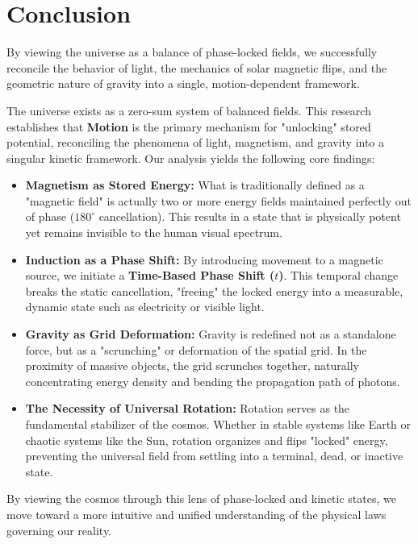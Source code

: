 \documentclass[11pt]{article}
\begin{document}
\section{Conclusion}

By viewing the universe as a balance of phase-locked fields, we successfully reconcile the behavior of light, the mechanics of solar magnetic flips, and the geometric nature of gravity into a single, motion-dependent framework.

The universe exists as a zero-sum system of balanced fields. This research establishes that \textbf{Motion} is the primary mechanism for "unlocking" stored potential, reconciling the phenomena of light, magnetism, and gravity into a singular kinetic framework. Our analysis yields the following core findings:

\begin{itemize}
    \item \textbf{Magnetism as Stored Energy:} What is traditionally defined as a "magnetic field" is actually two or more energy fields maintained perfectly out of phase ($180^\circ$ cancellation). This results in a state that is physically potent yet remains invisible to the human visual spectrum.
    
    \item \textbf{Induction as a Phase Shift:} By introducing movement to a magnetic source, we initiate a \textbf{Time-Based Phase Shift ($t$)}. This temporal change breaks the static cancellation, "freeing" the locked energy into a measurable, dynamic state such as electricity or visible light.
    
    \item \textbf{Gravity as Grid Deformation:} Gravity is redefined not as a standalone force, but as a "scrunching" or deformation of the spatial grid. In the proximity of massive objects, the grid scrunches together, naturally concentrating energy density and bending the propagation path of photons.
    
    \item \textbf{The Necessity of Universal Rotation:} Rotation serves as the fundamental stabilizer of the cosmos. Whether in stable systems like Earth or chaotic systems like the Sun, rotation organizes and flips "locked" energy, preventing the universal field from settling into a terminal, dead, or inactive state.
\end{itemize}

By viewing the cosmos through this lens of phase-locked and kinetic states, we move toward a more intuitive and unified understanding of the physical laws governing our reality.
\end{document}
